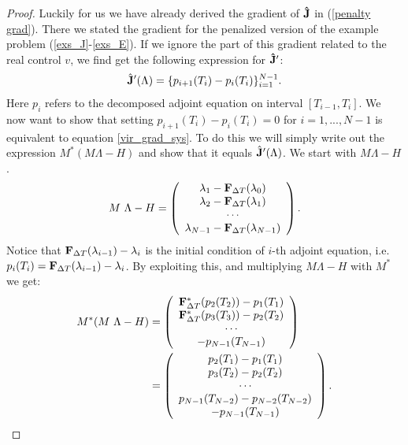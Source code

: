 \documentclass[11pt,a4paper]{article}
\begin{document}
\begin{proof}
Luckily for us we have already derived the gradient of $\bold{\hat J}$ in (\ref{penalty grad}). There we stated the gradient for the penalized version of the example problem (\ref{exs_J}-\ref{exs_E}). If we ignore the part of this gradient related to the real control $v$, we find get the following expression for $\bold{\hat J}'$:
\begin{align*}
\hat{\bold J}'(\Lambda) = \{p_{i+1}(T_i)-p_{i}(T_i)\}_{i=1}^{N-1}.
\end{align*}
Here $p_i$ refers to the decomposed adjoint equation on interval $[T_{i-1},T_{i}]$. We now want to show that setting $p_{i+1}(T_i)-p_{i}(T_i)=0$ for $i=1,...,N-1$ is equivalent to equation \ref{vir_grad_sys}. To do this we will simply write out the expression $M^*(M\Lambda-H)$ and show that it equals $\hat{\bold J}'(\Lambda)$. We start with $M\Lambda-H$.
\begin{align*}
M \ \Lambda - H  = \left( \begin{array}{c}
	\lambda_1-\bold{F}_{\Delta T}(\lambda_0)\\
	\lambda_2-\bold{F}_{\Delta T}(\lambda_1) \\
	\cdots \\
	\lambda_{N-1}-\bold{F}_{\Delta T}(\lambda_{N-1}) 
	\end{array} \right).
\end{align*}
Notice that $\bold{F}_{\Delta T}(\lambda_{i-1})-\lambda_i$ is the initial condition of $i$-th adjoint equation, i.e. $p_i(T_i)=\bold{F}_{\Delta T}(\lambda_{i-1})-\lambda_i$. By exploiting this, and multiplying $M\Lambda-H$ with $M^*$ we get:
\begin{align}
M^* (M \ \Lambda-H)&=
	\left( \begin{array}{c}
	 \bold{F}_{\Delta T}^*(p_2( T_2))-p_1(T_1)\\
	\bold{F}_{\Delta T}^*(p_3( T_3))-p_2(T_2)\\
	\cdots \\
	-p_{N-1}(T_{N-1})
	\end{array} \right)
	\\
	&=\left( \begin{array}{c}
	p_2(T_1)-p_1(T_1)\\
	p_3(T_2)-p_2(T_2)\\
	\cdots \\
	p_{N-1}(T_{N-2})-p_{N-2}(T_{N-2}) \\
	-p_{N-1}(T_{N-1})
	\end{array} \right).
\end{align}

\end{proof}
\end{document}
